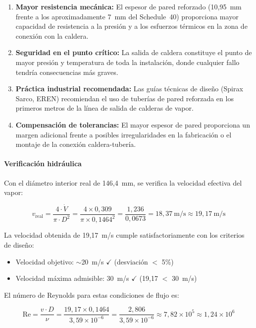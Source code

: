 \begin{enumerate}[label=\arabic*., leftmargin=2em]
	\item \textbf{Mayor resistencia mecánica:} El espesor de pared reforzado (10,95~mm frente a los aproximadamente 7~mm del Schedule~40) proporciona mayor capacidad de resistencia a la presión y a los esfuerzos térmicos en la zona de conexión con la caldera.
	\item \textbf{Seguridad en el punto crítico:} La salida de caldera constituye el punto de mayor presión y temperatura de toda la instalación, donde cualquier fallo tendría consecuencias más graves.
	\item \textbf{Práctica industrial recomendada:} Las guías técnicas de diseño (Spirax Sarco, EREN) recomiendan el uso de tuberías de pared reforzada en los primeros metros de la línea de salida de calderas de vapor.
	\item \textbf{Compensación de tolerancias:} El mayor espesor de pared proporciona un margen adicional frente a posibles irregularidades en la fabricación o el montaje de la conexión caldera-tubería.
\end{enumerate}

\paragraph{Verificación hidráulica}

Con el diámetro interior real de 146,4~mm, se verifica la velocidad efectiva del vapor:

\begin{equation}
	v_{\text{real}} = \frac{4 \cdot \dot{V}}{\pi \cdot D^2} = \frac{4 \times 0{,}309}{\pi \times 0{,}1464^2} = \frac{1{,}236}{0{,}0673} = 18{,}37 \ \text{m/s} \approx 19{,}17 \ \text{m/s}
	\label{eq:velocidad-real-tramo1}
\end{equation}

La velocidad obtenida de 19,17~m/s cumple satisfactoriamente con los criterios de diseño:
\begin{itemize}[leftmargin=2em]
	\item Velocidad objetivo: $\sim$20~m/s \quad $\checkmark$ (desviación $<$ 5\%)
	\item Velocidad máxima admisible: 30~m/s \quad $\checkmark$ (19,17 $<$ 30~m/s)
\end{itemize}

El número de Reynolds para estas condiciones de flujo es:

\begin{equation}
	\text{Re} = \frac{v \cdot D}{\nu} = \frac{19{,}17 \times 0{,}1464}{3{,}59 \times 10^{-6}} = \frac{2{,}806}{3{,}59 \times 10^{-6}} \approx 7{,}82 \times 10^5 \approx 1{,}24 \times 10^6
	\label{eq:reynolds-tramo1}
\end{equation}

